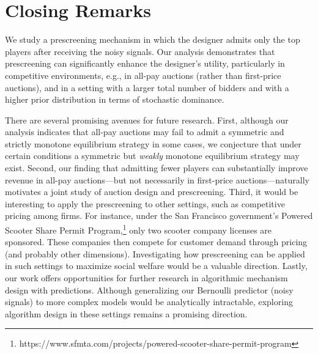 

\section{Closing Remarks}
\label{sec:conclusion}

We study a prescreening mechanism in which the designer admits only the top players after receiving the noisy signals. Our analysis demonstrates that prescreening can significantly enhance the designer's utility, particularly in competitive environments, e.g., in all-pay auctions (rather than first-price auctions), and in a setting with a larger total number of bidders and with a higher prior distribution in terms of stochastic dominance.





There are several promising avenues for future research. First, although our analysis indicates that all-pay auctions may fail to admit a symmetric and strictly monotone equilibrium strategy in some cases, we conjecture that under certain conditions a symmetric but \emph{weakly} monotone equilibrium strategy may exist. Second, our finding that admitting fewer players can substantially improve revenue in all-pay auctions—but not necessarily in first-price auctions—naturally motivates a joint study of auction design and prescreening. Third, it would be interesting to apply the prescreening to other settings, such as competitive pricing among firms. 
For instance, under the San Francisco government's Powered Scooter Share Permit Program,\footnote{https://www.sfmta.com/projects/powered-scooter-share-permit-program} only two scooter company licenses are sponsored. These companies then compete for customer demand through pricing (and probably other dimensions). Investigating how prescreening can be applied in such settings to maximize social welfare would be a valuable direction.
Lastly, our work offers opportunities for further research in algorithmic mechanism design with predictions. Although generalizing our Bernoulli predictor (noisy signals) to more complex models would be analytically intractable, exploring algorithm design in these settings remains a promising direction.





